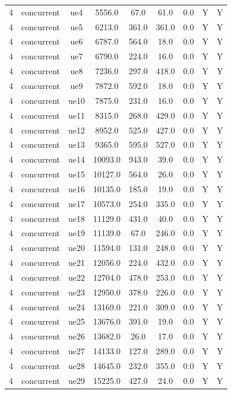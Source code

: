 \begin{table}[ht]
\begin{tabular}{|c|c|c|c|c|c|c|c|c|}
4 & concurrent & ue4 & 5556.0 & 67.0 & 61.0 & 0.0 & Y & Y \\
4 & concurrent & ue5 & 6213.0 & 361.0 & 361.0 & 0.0 & Y & Y \\
4 & concurrent & ue6 & 6787.0 & 564.0 & 18.0 & 0.0 & Y & Y \\
4 & concurrent & ue7 & 6790.0 & 224.0 & 16.0 & 0.0 & Y & Y \\
4 & concurrent & ue8 & 7236.0 & 297.0 & 418.0 & 0.0 & Y & Y \\
4 & concurrent & ue9 & 7872.0 & 592.0 & 18.0 & 0.0 & Y & Y \\
4 & concurrent & ue10 & 7875.0 & 231.0 & 16.0 & 0.0 & Y & Y \\
4 & concurrent & ue11 & 8315.0 & 268.0 & 429.0 & 0.0 & Y & Y \\
4 & concurrent & ue12 & 8952.0 & 525.0 & 427.0 & 0.0 & Y & Y \\
4 & concurrent & ue13 & 9365.0 & 595.0 & 527.0 & 0.0 & Y & Y \\
4 & concurrent & ue14 & 10093.0 & 943.0 & 39.0 & 0.0 & Y & Y \\
4 & concurrent & ue15 & 10127.0 & 564.0 & 26.0 & 0.0 & Y & Y \\
4 & concurrent & ue16 & 10135.0 & 185.0 & 19.0 & 0.0 & Y & Y \\
4 & concurrent & ue17 & 10573.0 & 254.0 & 335.0 & 0.0 & Y & Y \\
4 & concurrent & ue18 & 11129.0 & 431.0 & 40.0 & 0.0 & Y & Y \\
4 & concurrent & ue19 & 11139.0 & 67.0 & 246.0 & 0.0 & Y & Y \\
4 & concurrent & ue20 & 11594.0 & 131.0 & 248.0 & 0.0 & Y & Y \\
4 & concurrent & ue21 & 12056.0 & 224.0 & 432.0 & 0.0 & Y & Y \\
4 & concurrent & ue22 & 12704.0 & 478.0 & 253.0 & 0.0 & Y & Y \\
4 & concurrent & ue23 & 12950.0 & 378.0 & 226.0 & 0.0 & Y & Y \\
4 & concurrent & ue24 & 13169.0 & 221.0 & 309.0 & 0.0 & Y & Y \\
4 & concurrent & ue25 & 13676.0 & 391.0 & 19.0 & 0.0 & Y & Y \\
4 & concurrent & ue26 & 13682.0 & 26.0 & 17.0 & 0.0 & Y & Y \\
4 & concurrent & ue27 & 14133.0 & 127.0 & 289.0 & 0.0 & Y & Y \\
4 & concurrent & ue28 & 14645.0 & 232.0 & 355.0 & 0.0 & Y & Y \\
4 & concurrent & ue29 & 15225.0 & 427.0 & 24.0 & 0.0 & Y & Y \\

\end{tabular}
\end{table}

